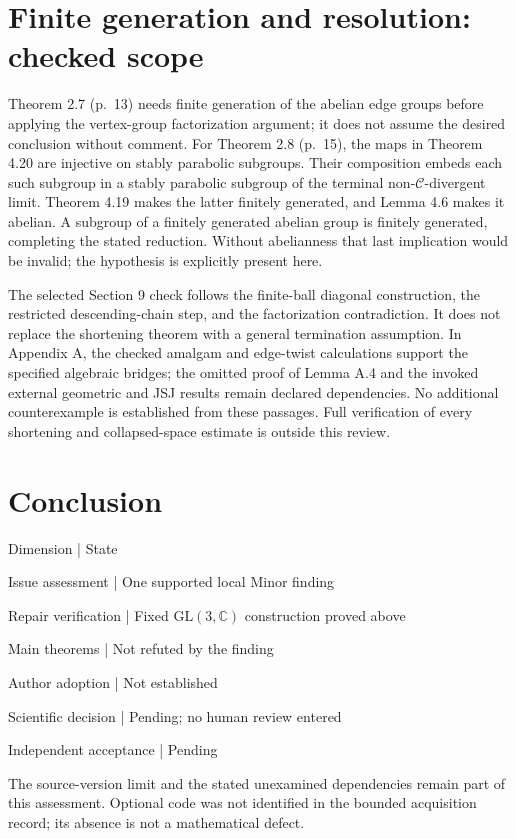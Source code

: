 \documentclass[10pt]{article}
\begin{document}
\section*{Finite generation and resolution: checked scope}
Theorem 2.7 (p. 13) needs finite generation of the abelian edge groups before applying the vertex-group factorization argument; it does not assume the desired conclusion without comment. For Theorem 2.8 (p. 15), the maps in Theorem 4.20 are injective on stably parabolic subgroups. Their composition embeds each such subgroup in a stably parabolic subgroup of the terminal non-\(\mathcal C\)-divergent limit. Theorem 4.19 makes the latter finitely generated, and Lemma 4.6 makes it abelian. A subgroup of a finitely generated abelian group is finitely generated, completing the stated reduction. Without abelianness that last implication would be invalid; the hypothesis is explicitly present here.\par
The selected Section 9 check follows the finite-ball diagonal construction, the restricted descending-chain step, and the factorization contradiction. It does not replace the shortening theorem with a general termination assumption. In Appendix A, the checked amalgam and edge-twist calculations support the specified algebraic bridges; the omitted proof of Lemma A.4 and the invoked external geometric and JSJ results remain declared dependencies. No additional counterexample is established from these passages. Full verification of every shortening and collapsed-space estimate is outside this review.\par
\section*{Conclusion}
Dimension | State\par
Issue assessment | One supported local Minor finding\par
Repair verification | Fixed \(\mathrm{GL}(3,\mathbb C)\) construction proved above\par
Main theorems | Not refuted by the finding\par
Author adoption | Not established\par
Scientific decision | Pending; no human review entered\par
Independent acceptance | Pending\par
The source-version limit and the stated unexamined dependencies remain part of this assessment. Optional code was not identified in the bounded acquisition record; its absence is not a mathematical defect.\par
\end{document}

